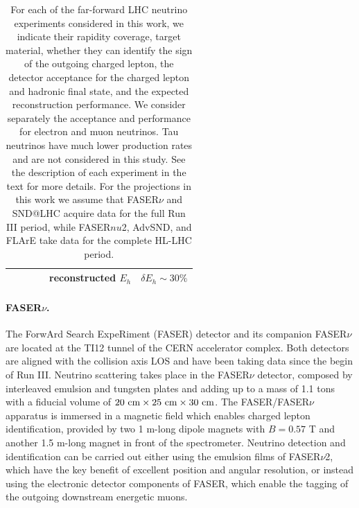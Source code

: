 \begin{table}[t]
\begin{tabularx}{\textwidth}{Xccccc}
 &   &     &  & reconstructed $E_h$  &    $\delta E_h \sim 30\% $   \\
  \bottomrule
\end{tabularx}
\vspace{0.2cm}
\caption{\small For each of the far-forward LHC neutrino experiments considered
  in this work, we indicate their rapidity coverage, target material, whether
  they can identify the sign of the outgoing charged lepton,
  the detector acceptance for the charged lepton and hadronic final state,
  and the expected reconstruction performance.
  We consider separately the acceptance and performance for electron and muon
  neutrinos.
  Tau neutrinos have much lower production rates and are not considered in this study.
  See the description of each experiment in the text for more details.
  For the projections in this work we assume that FASER$\nu$ and SND@LHC acquire data
  for the full Run III period, while FASER$nu$2, AdvSND, and FLArE take data
  for the complete HL-LHC period.
  \label{tab:FPF_experiments}
}
\end{table}

\paragraph{FASER$\nu$.}
%
The ForwArd Search ExpeRiment (FASER) detector and its companion FASER$\nu$
are located at the TI12 tunnel of the CERN accelerator complex.
%
Both detectors are aligned
with the collision axis LOS  and have been taking data since the begin of Run III.
%
Neutrino scattering takes place in the FASER$\nu$
detector, composed by interleaved emulsion and tungsten plates and
adding up to a mass of 1.1 tons with a fiducial volume of $20~\rm{cm} \times 25~\rm{cm} \times 30~{\rm cm}$.
%
The FASER/FASER$\nu$ apparatus is immersed in a magnetic field which enables charged lepton
identification, provided by two 1 m-long dipole magnets with $B=0.57$ T
and another 1.5 m-long magnet in front of the spectrometer. 
%
Neutrino detection and identification can be carried out either using the emulsion
films of FASER$\nu$2, which have the key benefit of excellent position and angular resolution,
or instead using the electronic detector components of FASER, which enable the tagging
of the outgoing downstream energetic muons. 

